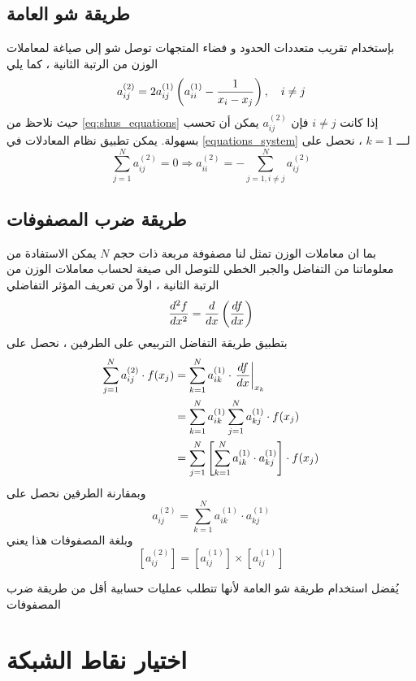 \subsection[طريقة شو العامة]{طريقة شو العامة \cite{chang_shu} }
بإستخدام تقريب متعددات الحدود و فضاء المتجهات توصل شو إلى صياغة لمعاملات الوزن من الرتبة الثانية ، كما يلي
\begin{equation}
	\label{eq:shus_equations}
	a_{ij}^{(2)}=2a_{ij}^{(1)}\left(a_{ii}^{(1)}-\frac{1}{x_i-x_j}\right),\quad i\not=j
\end{equation}
حيث نلاحظ من \eqref{eq:shus_equations} إذا كانت $i\neq j$ فإن $a_{ij}^{(2)}$ يمكن أن تحسب بسهولة. يمكن تطبيق نظام المعادلات في \eqref{equations_system} لـــ $k=1$ ، نحصل على
\[
\sum_{j=1}^{N}a_{ij}^{(2)}=0\Longrightarrow a_{ii}^{(2)}=-\sum_{j=1,i\neq j}^{N}a_{ij}^{(2)}
\]


\subsection[طريقة ضرب المصفوفات]{طريقة ضرب المصفوفات \cite{chang_shu} }
بما ان معاملات الوزن تمثل لنا مصفوفة مربعة ذات حجم $N$ يمكن الاستفادة من معلوماتنا من التفاضل والجبر الخطي للتوصل الى صيغة لحساب معاملات الوزن من الرتبة الثانية ، اولاً من تعريف المؤثر التفاضلي
\[
\frac{d^2f}{dx^2}=\frac{d}{dx}\left(\frac{df}{dx}\right)
\]
بتطبيق طريقة التفاضل التربيعي على الطرفين ، نحصل على
\begin{align*}
	\sum_{j=1}^{N}a_{ij}^{(2)}\cdot f(x_j)&=\sum_{k=1}^{N}a_{ik}^{(1)}\cdot \left.\frac{df}{dx}\right|_{x_k}\\
	&=\sum_{k=1}^{N}a_{ik}^{(1)}\sum_{j=1}^{N}a_{kj}^{(1)}\cdot f(x_j)\\
	&=\sum_{j=1}^{N}\left[\sum_{k=1}^{N}a_{ik}^{(1)}\cdot a_{kj}^{(1)}\right]\cdot f(x_j)
\end{align*}
وبمقارنة الطرفين نحصل على
\begin{equation}
	a_{ij}^{(2)}=\sum_{k=1}^{N}a_{ik}^{(1)}\cdot a_{kj}^{(1)}
\end{equation}
وبلغة المصفوفات هذا يعني
\begin{equation}
	\label{second_order_equations}
	[a_{ij}^{(2)}]=[a_{ij}^{(1)}]\times[a_{ij}^{(1)}]
\end{equation}

\begin{note}
	يُفضل استخدام طريقة شو العامة لأنها تتطلب عمليات حسابية أقل من طريقة ضرب المصفوفات
\end{note}

\section[اختيار نقاط الشبكة]{اختيار نقاط الشبكة }

